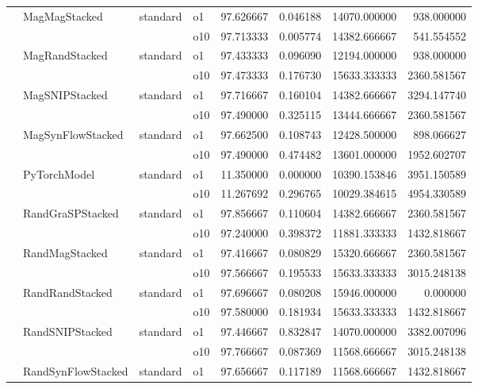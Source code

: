 \begin{longtable}{llllrrrr}
      & MagMagStacked & standard & o1 &  97.626667 &   0.046188 &     14070.000000 &    938.000000 \\
      &     &         & o10 &  97.713333 &   0.005774 &     14382.666667 &    541.554552 \\
      & MagRandStacked & standard & o1 &  97.433333 &   0.096090 &     12194.000000 &    938.000000 \\
      &     &         & o10 &  97.473333 &   0.176730 &     15633.333333 &   2360.581567 \\
      & MagSNIPStacked & standard & o1 &  97.716667 &   0.160104 &     14382.666667 &   3294.147740 \\
      &     &         & o10 &  97.490000 &   0.325115 &     13444.666667 &   2360.581567 \\
      & MagSynFlowStacked & standard & o1 &  97.662500 &   0.108743 &     12428.500000 &    898.066627 \\
      &     &         & o10 &  97.490000 &   0.474482 &     13601.000000 &   1952.602707 \\
      & PyTorchModel & standard & o1 &  11.350000 &   0.000000 &     10390.153846 &   3951.150589 \\
      &     &         & o10 &  11.267692 &   0.296765 &     10029.384615 &   4954.330589 \\
      & RandGraSPStacked & standard & o1 &  97.856667 &   0.110604 &     14382.666667 &   2360.581567 \\
      &     &         & o10 &  97.240000 &   0.398372 &     11881.333333 &   1432.818667 \\
      & RandMagStacked & standard & o1 &  97.416667 &   0.080829 &     15320.666667 &   2360.581567 \\
      &     &         & o10 &  97.566667 &   0.195533 &     15633.333333 &   3015.248138 \\
      & RandRandStacked & standard & o1 &  97.696667 &   0.080208 &     15946.000000 &      0.000000 \\
      &     &         & o10 &  97.580000 &   0.181934 &     15633.333333 &   1432.818667 \\
      & RandSNIPStacked & standard & o1 &  97.446667 &   0.832847 &     14070.000000 &   3382.007096 \\
      &     &         & o10 &  97.766667 &   0.087369 &     11568.666667 &   3015.248138 \\
      & RandSynFlowStacked & standard & o1 &  97.656667 &   0.117189 &     11568.666667 &   1432.818667 \\

\end{longtable}
